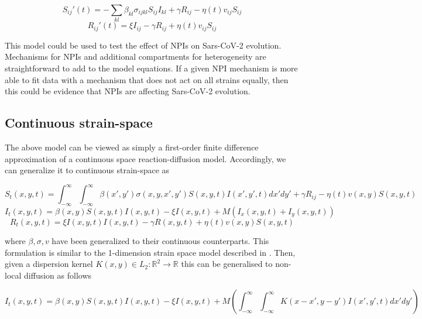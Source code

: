 \documentclass{article}
\begin{document}
\begin{equation}
    S_{ij}'(t) = -\sum_{kl} \beta_{kl} \sigma_{ijkl} S_{ij} I_{kl} + \gamma R_{ij} -  \eta(t) v_{ij} S_{ij} \label{Seqn}
\end{equation}
\begin{equation}
    R_{ij}'(t) = \xi I_{ij} - \gamma R_{ij} + \eta(t) v_{ij} S_{ij} \label{Reqn}
\end{equation}


This model could be used to test the effect of NPIs on Sars-CoV-2 evolution. Mechanisms for NPIs and additional compartments for heterogeneity are straightforward to add to the model equations. If a given NPI mechanism is more able to fit data with a mechanism that does not act on all strains equally, then this could be evidence that NPIs are affecting Sars-CoV-2 evolution. 

\subsection{Continuous strain-space}

The above model can be viewed as simply a first-order finite difference approximation of a continuous space reaction-diffusion model. Accordingly, we can generalize it to continuous strain-space as
 
\begin{equation}
    S_t(x,y,t) = \int_{-\infty}^{\infty} \int_{-\infty}^{\infty} \beta(x',y') \sigma(x,y,x', y') S(x,y,t) I(x',y',t) dx' dy' + \gamma R_{ij} -  \eta(t) v(x,y) S(x,y,t)\label{Seqn_cts}
\end{equation}
\begin{equation}
    I_t(x,y,t) = \beta(x,y) S(x,y,t) I(x,y,t)- \xi I(x,y,t) + M \left(I_x(x,y,t)  + I_y(x,y,t)  \right) \label{Ieqn_cts}    
\end{equation}
\begin{equation}
    R_t(x,y,t) = \xi I(x,y,t)I(x,y,t) - \gamma R(x,y,t) + \eta(t) v(x,y) S(x,y,t) \label{Reqn_cts}
\end{equation}

where $\beta, \sigma, v$ have been generalized to their continuous counterparts. This formulation is similar to the 1-dimension strain space model described in \cite{Bessonov_Bocharov_Meyerhans_Popov_Volpert_2021}. Then, given a dispersion kernel $K(x,y) \in L_2: \mathbb{R}^2 \to \mathbb{R}$ this can be generalised to non-local diffusion as follows

\begin{equation}
    I_t(x,y,t) = \beta(x,y) S(x,y,t) I(x,y,t)- \xi I(x,y,t) + M \left(\int_{-\infty}^{\infty} \int_{-\infty}^{\infty} K(x-x',y-y')I(x',y',t) dx' dy' \right) \label{Ieqn_cts_nonlocal}    
\end{equation}
\end{document}
